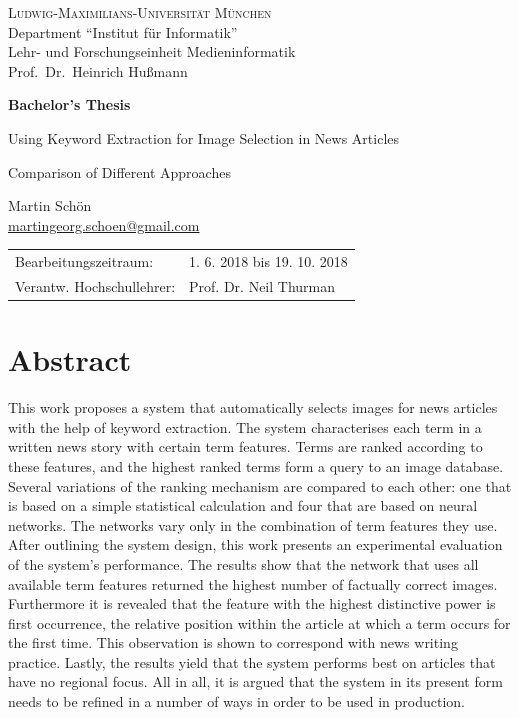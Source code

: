 \documentclass[11pt,a4paper,twoside]{article}
\begin{document}
\pagestyle{empty} %

\begin{center}
\textsc{Ludwig-Maximilians-Universität München}\\
Department ``Institut für Informatik''\\
Lehr- und Forschungseinheit Medieninformatik\\
Prof.\ Dr.\ Heinrich Hußmann

\vspace{5cm}
{\large\textbf{Bachelor's Thesis}}\vspace{.5cm}

{\LARGE Using Keyword Extraction for Image Selection in News Articles}\vspace{.3cm}

{\Large Comparison of Different Approaches}\vspace{1cm}

{\large Martin Schön}\\\href{mailto:martingeorg.schoen@gmail.com}{martingeorg.schoen@gmail.com}

\end{center}
\vfill

\begin{tabular}{ll}
Bearbeitungszeitraum: & 1. 6. 2018 bis 19. 10. 2018\\
Verantw. Hochschullehrer: & Prof. Dr. Neil Thurman
\end{tabular}

\clearpage
{}
\section*{Abstract}

This work proposes a system that automatically selects images for news articles with the help of keyword extraction. The system characterises each term in a written news story with certain term features. Terms are ranked according to these features, and the highest ranked terms form a query to an image database. Several variations of the ranking mechanism are compared to each other: one that is based on a simple statistical calculation and four that are based on neural networks. The networks vary only in the combination of term features they use. After outlining the system design, this work presents an experimental evaluation of the system's performance. The results show that the network that uses all available term features returned the highest number of factually correct images. Furthermore it is revealed that the feature with the highest distinctive power is first occurrence, the relative position within the article at which a term occurs for the first time. This observation is shown to correspond with news writing practice. Lastly, the results yield that the system performs best on articles that have no regional focus. All in all, it is argued that the system in its present form needs to be refined in a number of ways in order to be used in production.
\end{document}
